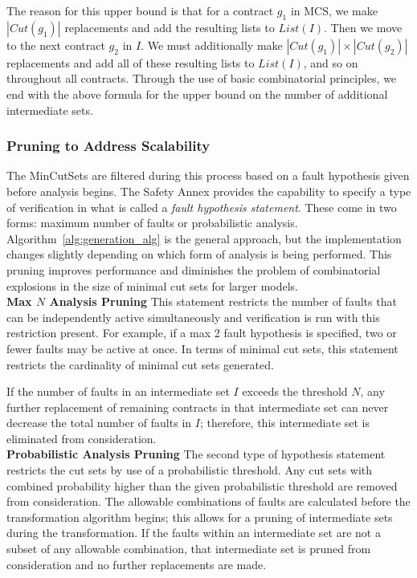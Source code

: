 The reason for this upper bound is that for a contract $g_1$ in MCS, we make $|Cut(g_1)|$ replacements and add the resulting lists to $List(I)$. Then we move to the next contract $g_2$ in $I$. We must additionally make $|Cut(g_1)| \times |Cut(g_2)|$ replacements and add all of these resulting lists to $List(I)$, and so on throughout all contracts. Through the use of basic combinatorial principles, we end with the above formula for the upper bound on the number of additional intermediate sets.


\subsubsection{Pruning to Address Scalability}
The MinCutSets are filtered during this process based on a fault hypothesis given before analysis begins. The Safety Annex provides the capability to specify a type of verification in what is called a \textit{fault hypothesis statement}. These come in two forms: maximum number of faults or probabilistic analysis. Algorithm~\ref{alg:generation_alg} is the general approach, but the implementation changes slightly depending on which form of analysis is being performed. This pruning improves performance and diminishes the problem of combinatorial explosions in the size of minimal cut sets for larger models. \\

\textbf{Max $N$ Analysis Pruning} This statement restricts the number of faults that can be independently active simultaneously and verification is run with this restriction present. For example, if a max 2 fault hypothesis is specified, two or fewer faults may be active at once. In terms of minimal cut sets, this statement restricts the cardinality of minimal cut sets generated.

If the number of faults in an intermediate set $I$ exceeds the threshold $N$, any further replacement of remaining contracts in that intermediate set can never decrease the total number of faults in $I$; therefore, this intermediate set is eliminated from consideration.\\

\textbf{Probabilistic Analysis Pruning} The second type of hypothesis statement restricts the cut sets by use of a probabilistic threshold. Any cut sets with combined probability higher than the given probabilistic threshold are removed from consideration. The allowable combinations of faults are calculated before the transformation algorithm begins; this allows for a pruning of intermediate sets during the transformation. If the faults within an intermediate set are not a subset of any allowable combination, that intermediate set is pruned from consideration and no further replacements are made. 




